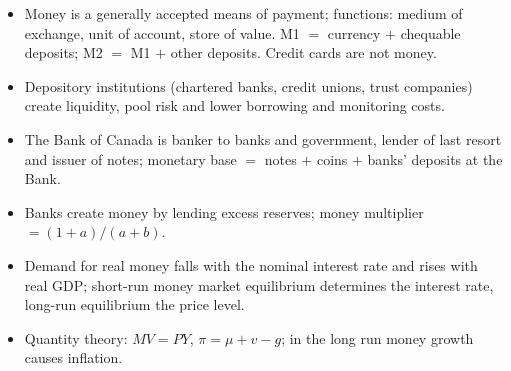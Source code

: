 \begin{itemize}
  \item Money is a generally accepted means of payment; functions: medium of exchange,
        unit of account, store of value. M1 $=$ currency $+$ chequable deposits; M2 $=$ M1
        $+$ other deposits. Credit cards are not money.
  \item Depository institutions (chartered banks, credit unions, trust companies) create
        liquidity, pool risk and lower borrowing and monitoring costs.
  \item The Bank of Canada is banker to banks and government, lender of last resort and
        issuer of notes; monetary base $=$ notes $+$ coins $+$ banks' deposits at the Bank.
  \item Banks create money by lending excess reserves; money multiplier
        $= (1 + a)/(a + b)$.
  \item Demand for real money falls with the nominal interest rate and rises with real
        GDP; short-run money market equilibrium determines the interest rate, long-run
        equilibrium the price level.
  \item Quantity theory: $MV = PY$, $\pi = \mu + v - g$; in the long run money growth
        causes inflation.
\end{itemize}
